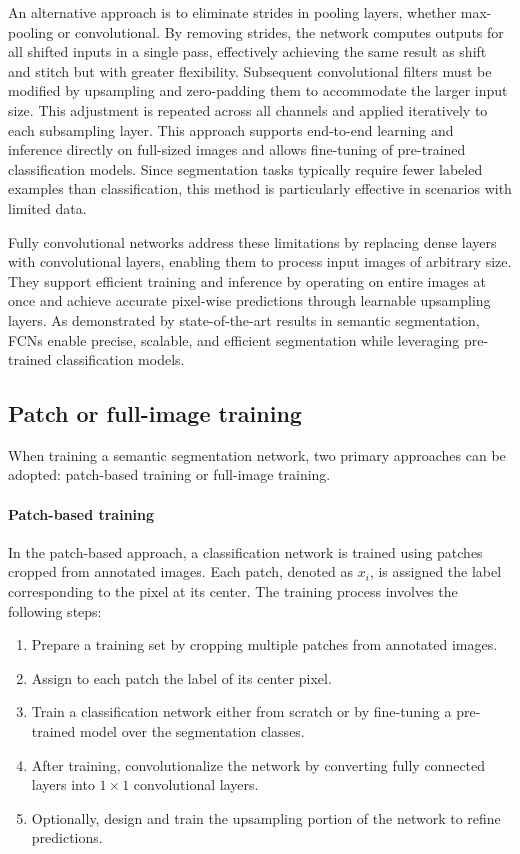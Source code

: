 An alternative approach is to eliminate strides in pooling layers, whether max-pooling or convolutional. 
By removing strides, the network computes outputs for all shifted inputs in a single pass, effectively achieving the same result as shift and stitch but with greater flexibility. 
Subsequent convolutional filters must be modified by upsampling and zero-padding them to accommodate the larger input size. 
This adjustment is repeated across all channels and applied iteratively to each subsampling layer. 
This approach supports end-to-end learning and inference directly on full-sized images and allows fine-tuning of pre-trained classification models. 
Since segmentation tasks typically require fewer labeled examples than classification, this method is particularly effective in scenarios with limited data.

Fully convolutional networks address these limitations by replacing dense layers with convolutional layers, enabling them to process input images of arbitrary size. 
They support efficient training and inference by operating on entire images at once and achieve accurate pixel-wise predictions through learnable upsampling layers. 
As demonstrated by state-of-the-art results in semantic segmentation, FCNs enable precise, scalable, and efficient segmentation while leveraging pre-trained classification models.

\subsection{Patch or full-image training}
When training a semantic segmentation network, two primary approaches can be adopted: patch-based training or full-image training.

\paragraph*{Patch-based training}
In the patch-based approach, a classification network is trained using patches cropped from annotated images. 
Each patch, denoted as $x_i$, is assigned the label corresponding to the pixel at its center. 
The training process involves the following steps:
\begin{enumerate}
    \item Prepare a training set by cropping multiple patches from annotated images.
    \item Assign to each patch the label of its center pixel.
    \item Train a classification network either from scratch or by fine-tuning a pre-trained model over the segmentation classes.
    \item After training, convolutionalize the network by converting fully connected layers into $1 \times 1$ convolutional layers.
    \item Optionally, design and train the upsampling portion of the network to refine predictions.
\end{enumerate}

